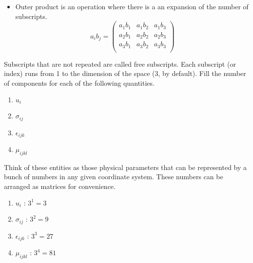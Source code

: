 \begin{itemize}
\item Outer product  is an operation where there is a an expansion of the number of subscripts.
\begin{equation*}
a_{i}b_{j} = \left( \begin{array}{ccc}
a_{1}b_{1} & a_{1}b_{2} & a_{1}b_{3} \\
a_{2}b_{1} & a_{2}b_{2} & a_{2}b_{3} \\
a_{3}b_{1} & a_{3}b_{2} & a_{3}b_{3} \\
\end{array}\right) 
\end{equation*} 

\end{itemize}


\begin{question}
Subscripts that are not repeated are called free subscripts. Each subscript (or index) runs from 1 to the dimension of the space (3, by default). 
Fill the number of components for each of the following quantities.
	\begin{enumerate}
		\item $u_i$
		\item $\sigma_{ij}$
		\item $\epsilon_{ijk}$
		\item $\mu_{ijkl}$
	\end{enumerate}

Think of these entities as those physical parameters that can be represented by a bunch of numbers in any given coordinate system. These numbers can be arranged as matrices for convenience.
\end{question}
\begin{solution}[print]
	\begin{enumerate}
		\item $u_i$ : $3^1=3$
		\item $\sigma_{ij}$ : $3^2=9$
		\item $\epsilon_{ijk}$ : $3^3=27$
		\item $\mu_{ijkl}$ : $3^4=81$
	\end{enumerate}
\end{solution}


